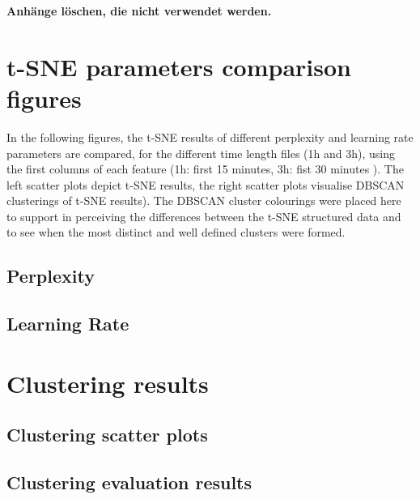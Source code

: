 \begin{appendices}
\textbf{\color{red} Anhänge löschen, die nicht verwendet werden.}

\section{t-SNE parameters comparison figures}
\label{appendix:tSNEParameters}
In the following figures, the t-SNE results of different perplexity and learning rate parameters are compared, for the different time length files (1h and 3h), using the first columns of each feature (1h: first 15 minutes, 3h: fist 30 minutes ). The left scatter plots depict t-SNE results, the right scatter plots visualise DBSCAN clusterings of t-SNE results). The DBSCAN cluster colourings were placed here to support in perceiving the differences between the t-SNE structured data and to see when the most distinct and well defined clusters were formed.

\subsection{Perplexity}
\label{appendix:tSNEParametersPerplexity}


\subsection{Learning Rate}
\label{appendix:tSNEParametersLearningRate}



\section{Clustering results}
\subsection{Clustering scatter plots}
\label{appendix:clusteringResults}

% 

\subsection{Clustering evaluation results}
\label{appendix:clusteringEvaluationResults}











\end{appendices}
